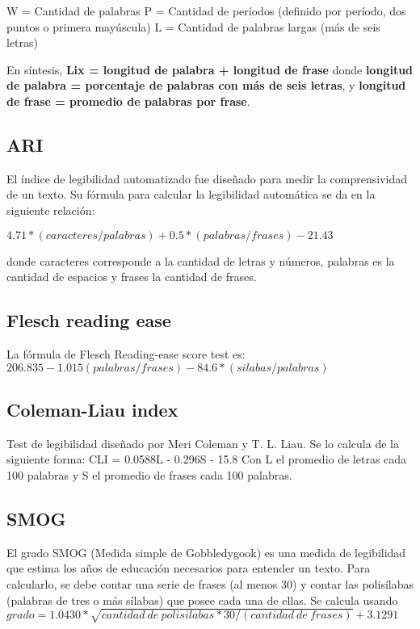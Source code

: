 \documentclass[12pt,journal,compsoc]{IEEEtran}
\begin{document}
W = Cantidad de palabras 
P = Cantidad de períodos (definido por período, dos puntos o primera mayúscula)
L = Cantidad de palabras largas (más de seis letras)

En síntesis, \textbf{Lix = longitud de palabra + longitud de frase} donde \textbf{longitud de palabra = porcentaje de palabras con más de seis letras}, y \textbf{longitud de frase = promedio de palabras por frase}.


\subsection{ARI}
El índice de legibilidad automatizado fue diseñado para medir la comprensividad de un texto. Su fórmula para calcular la legibilidad automática se da en la siguiente relación:

$4.71 * (caracteres/palabras)+0.5*(palabras/frases) - 21.43$

donde caracteres corresponde a la cantidad de letras y números, palabras es la cantidad de espacios y frases la cantidad de frases.

\subsection{Flesch reading ease}

La fórmula de Flesch Reading-ease score test es:
$206.835 - 1.015(palabras/frases) - 84.6*(silabas/palabras)$

\subsection{Coleman-Liau index}
Test de legibilidad diseñado por Meri Coleman y T. L. Liau. Se lo calcula de la siguiente forma: CLI = 0.0588L - 0.296S - 15.8
Con L el promedio de letras cada 100 palabras y S el promedio de frases cada 100 palabras.

\subsection{SMOG}
El grado SMOG (Medida simple de Gobbledygook) es una medida de legibilidad que estima los años de educación necesarios para entender un texto. Para calcularlo, se debe contar una serie de frases (al menos 30) y contar las polisílabas (palabras de tres o más sílabas) que posee cada una de ellas. Se calcula usando \textbf{$grado = 1.0430*\sqrt{cantidad\ de\ polisilabas * 30/(cantidad\ de\ frases)} + 3.1291$}
\end{document}
